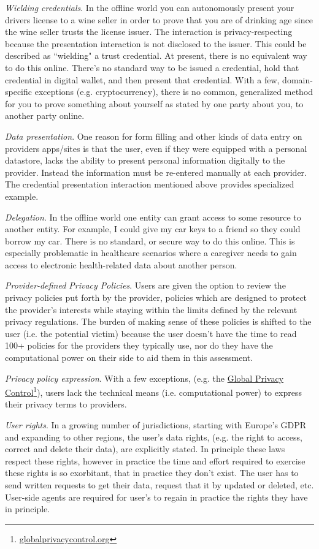\documentclass[11pt, oneside]{article}   	%
\newcommand{\hyperfootnote}[1][]{\def\ArgI{{#1}}\hyperfootnoteRelay}
\newcommand\hyperfootnoteRelay[2][]{\href{#1#2}{\ArgI}\footnote{\href{#1#2}{#2}}}
\begin{document}
\emph{Wielding credentials}. In the offline world you can autonomously present your drivers license to a wine seller in order to prove that you are of drinking age since the wine seller trusts the license issuer. The interaction is privacy-respecting because the presentation interaction is not disclosed to the issuer. This could be described as ``wielding" a trust credential. At present, there is no equivalent way to do this online. There's no standard way to be issued a credential, hold that credential in digital wallet, and then present that credential. With a few, domain-specific exceptions (e.g. cryptocurrency), there is no common, generalized method for you to prove something about yourself as stated by one party about you, to another party online.

\emph{Data presentation}. One reason for form filling and other kinds of data entry on providers apps/sites is that the user, even if they were equipped with a personal datastore, lacks the ability to present personal information digitally to the provider. Instead the information must be re-entered manually at each provider. The credential presentation interaction mentioned above provides specialized example.

\emph{Delegation}. In the offline world one entity can grant access to some resource to another entity. For example, I could give my car keys to a friend so they could borrow my car. There is no standard, or secure way to do this online. This is especially problematic in healthcare scenarios where a caregiver needs to gain access to electronic health-related data about another person.

\emph{Provider-defined Privacy Policies}. Users are given the option to review the privacy policies put forth by the provider, policies which are designed to protect the provider's interests while staying within the limits defined by the relevant privacy regulations. The burden of making sense of these policies is shifted to the user (i.e. the potential victim) because the user doesn't have the time to read 100+ policies for the providers they typically use, nor do they have the computational power on their side to aid them in this assessment. 

\emph{Privacy policy expression}. With a few exceptions, (e.g. the \hyperfootnote[Global Privacy Control][https://]{globalprivacycontrol.org}), users  lack the technical means (i.e. computational power) to express their privacy terms to providers. 

\emph{User rights}. In a growing number of jurisdictions, starting with Europe's GDPR and expanding to other regions, the user's data rights, (e.g. the right to access, correct and delete their data), are explicitly stated. In principle these laws respect these rights, however in practice the time and effort required to exercise these rights is so exorbitant, that in practice they don't exist. The user has to send written requests to get their data, request that it by updated or deleted, etc. User-side agents are required for user's to regain in practice the rights they have in principle. 
\end{document}
